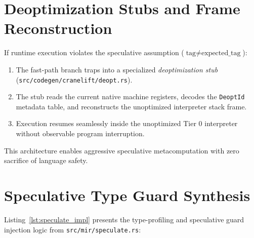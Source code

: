 \section{Deoptimization Stubs and Frame Reconstruction}
\label{sec:speculative:deopt_stubs}

If runtime execution violates the speculative assumption ($\text{tag} \ne \text{expected\_tag}$):
\begin{enumerate}
    \item The fast-path branch traps into a specialized \emph{deoptimization stub} (\texttt{src/codegen/cranelift/deopt.rs}).
    \item The stub reads the current native machine registers, decodes the \texttt{DeoptId} metadata table, and reconstructs the unoptimized interpreter stack frame.
    \item Execution resumes seamlessly inside the unoptimized Tier 0 interpreter without observable program interruption.
\end{enumerate}
This architecture enables aggressive speculative metacomputation with zero sacrifice of language safety.

\section{Speculative Type Guard Synthesis}
\label{sec:speculate:impl}

Listing~\ref{lst:speculate_impl} presents the type-profiling and speculative guard injection logic from \texttt{src/mir/speculate.rs}:

